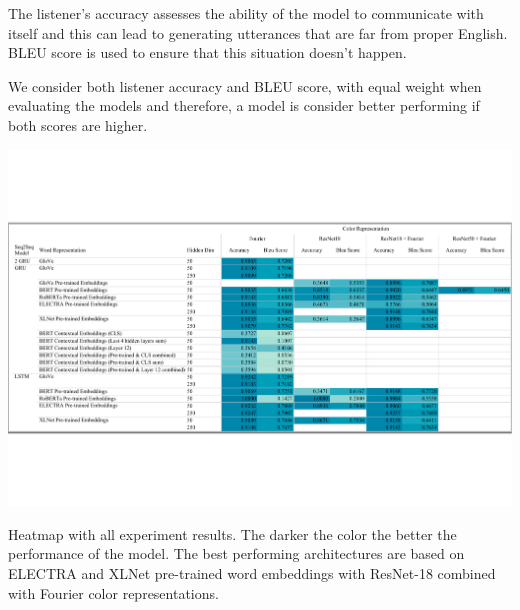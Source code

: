 \par
The listener's accuracy assesses the ability of the model to communicate with itself and this can lead to generating utterances that are far from proper English. BLEU score is used to ensure that this situation doesn’t happen.

\par
We consider both listener accuracy and BLEU score, with equal weight when evaluating the models and therefore, a model is consider better performing if both scores are higher.

\begin{table}[ht]
\centering
\includegraphics[width=\textwidth]{assets/heatmap.pdf}
\caption[Heatmap]{Heatmap with all experiment results. The darker the color the better the performance of the model. The best performing architectures are based on ELECTRA and XLNet pre-trained word embeddings with ResNet-18 combined with Fourier color representations.}
\label{table:heatmap}
\end{table}
